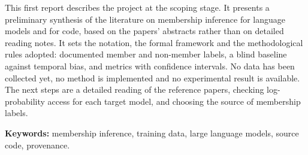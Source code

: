 This first report describes the project at the scoping stage. It presents a preliminary synthesis of the literature on membership inference for language models and for code, based on the papers' abstracts rather than on detailed reading notes. It sets the notation, the formal framework and the methodological rules adopted: documented member and non-member labels, a blind baseline against temporal bias, and metrics with confidence intervals. No data has been collected yet, no method is implemented and no experimental result is available. The next steps are a detailed reading of the reference papers, checking log-probability access for each target model, and choosing the source of membership labels.

\noindent\textbf{Keywords:} membership inference, training data, large language models, source code, provenance.
\newpage
